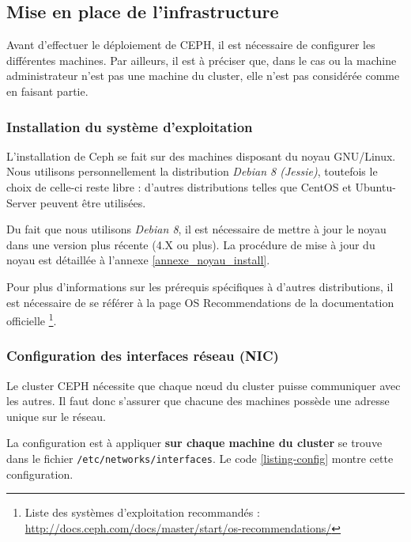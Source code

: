 \newpage

\subsection{Mise en place de l'infrastructure}

Avant d'effectuer le déploiement de CEPH, il est nécessaire de configurer les différentes machines. Par ailleurs, il est à préciser que, dans le cas ou la machine administrateur n'est pas une machine du cluster, elle n'est pas considérée comme en faisant partie.

\subsubsection{Installation du système d'exploitation} 

L'installation de Ceph se fait sur des machines disposant du noyau GNU/Linux. Nous utilisons personnellement la distribution \textit{Debian 8 (Jessie)}, toutefois le choix de celle-ci reste libre : d'autres distributions telles que CentOS et Ubuntu-Server peuvent être utilisées.

Du fait que nous utilisons \textit{Debian 8}, il est nécessaire de mettre à jour le noyau dans une version plus récente (4.X ou plus). La procédure de mise à jour du noyau est détaillée à l'annexe \ref{annexe_noyau_install}.

Pour plus d'informations sur les prérequis spécifiques à d'autres distributions, il est nécessaire de se référer à la page \og{}OS Recommendations\fg{} de la documentation officielle \footnote{Liste des systèmes d'exploitation recommandés : \url{http://docs.ceph.com/docs/master/start/os-recommendations/}}.

\subsubsection{Configuration des interfaces réseau (NIC)}

Le cluster CEPH nécessite que chaque nœud du cluster puisse communiquer avec les autres. Il faut donc s'assurer que chacune des machines possède une adresse unique sur le réseau. 

La configuration est à appliquer \textbf{sur chaque machine du cluster} se trouve dans le fichier \verb|/etc/networks/interfaces|. Le code \ref{listing-config} montre cette configuration.
\vspace{3mm}


